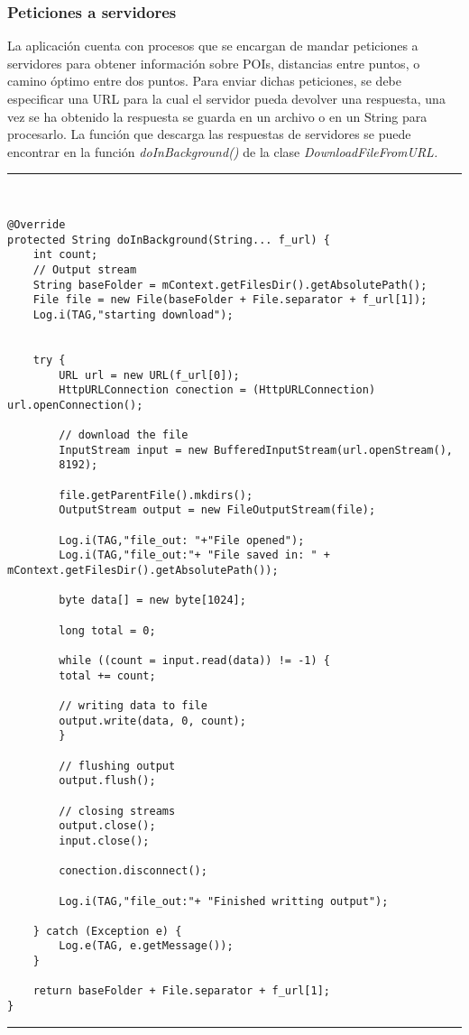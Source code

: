 \subsubsection{Peticiones a servidores}
La aplicación cuenta con procesos que se encargan de mandar peticiones a servidores para obtener información sobre POIs, distancias entre puntos, o camino óptimo entre dos puntos. Para enviar dichas peticiones, se debe especificar una URL para la cual el servidor pueda devolver una respuesta, una vez se ha obtenido la respuesta se guarda en un archivo o en un String para procesarlo. La función que descarga las respuestas de servidores se puede encontrar en la función \textit{doInBackground()} de la clase \textit{DownloadFileFromURL.}\newline
\newpage
\noindent\rule[-1ex]{\textwidth}{1pt}\\
\begin{lstlisting}[caption=Función para enviar peticiones a servidores y guardar respuesta.]
@Override
protected String doInBackground(String... f_url) {
	int count;
	// Output stream
	String baseFolder = mContext.getFilesDir().getAbsolutePath();
	File file = new File(baseFolder + File.separator + f_url[1]);
	Log.i(TAG,"starting download");
	
	
	try {
		URL url = new URL(f_url[0]);
		HttpURLConnection conection = (HttpURLConnection) url.openConnection();
		
		// download the file
		InputStream input = new BufferedInputStream(url.openStream(),
		8192);
		
		file.getParentFile().mkdirs();
		OutputStream output = new FileOutputStream(file);
		
		Log.i(TAG,"file_out: "+"File opened");
		Log.i(TAG,"file_out:"+ "File saved in: " + mContext.getFilesDir().getAbsolutePath());
		
		byte data[] = new byte[1024];
		
		long total = 0;
		
		while ((count = input.read(data)) != -1) {
		total += count;
		
		// writing data to file
		output.write(data, 0, count);
		}
		
		// flushing output
		output.flush();
		
		// closing streams
		output.close();
		input.close();
		
		conection.disconnect();
		
		Log.i(TAG,"file_out:"+ "Finished writting output");
	
	} catch (Exception e) {
		Log.e(TAG, e.getMessage());
	}
	
	return baseFolder + File.separator + f_url[1];
}
\end{lstlisting}
\noindent\rule[-1ex]{\textwidth}{1pt}\\

